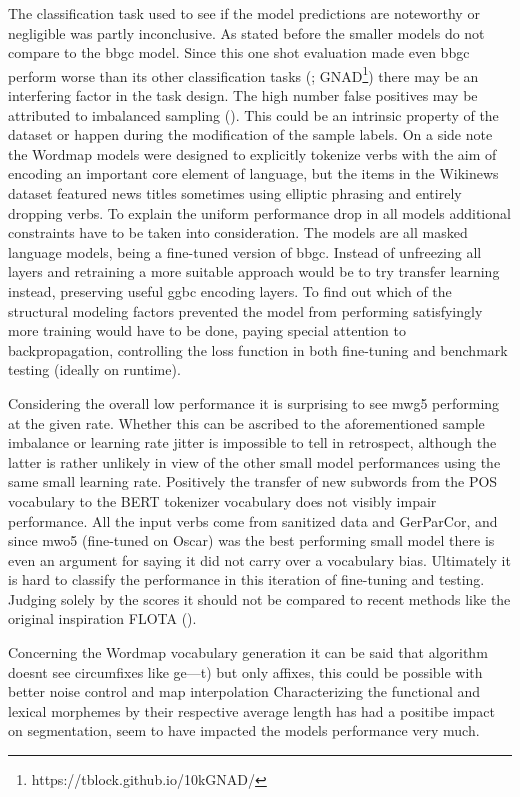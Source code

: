 The classification task used to see if the model predictions are noteworthy or negligible was partly inconclusive.
As stated before the smaller models do not compare to the bbgc model.
Since this one shot evaluation made even bbgc perform worse than its other classification tasks (\textcite{germeval}; GNAD\footnote{https://tblock.github.io/10kGNAD/}) there may be an interfering factor in the task design.
The high number false positives may be attributed to imbalanced sampling (\cite[5--6]{brownlee2020imbalanced}).
This could be an intrinsic property of the dataset or happen during the modification of the sample labels.
On a side note the Wordmap models were designed to explicitly tokenize verbs with the aim of encoding an important core element of language, but the items in the Wikinews dataset featured news titles sometimes using elliptic phrasing and entirely dropping verbs.
To explain the uniform performance drop in all models additional constraints have to be taken into consideration.
The models are all masked language models, being a fine-tuned version of bbgc.
Instead of unfreezing all layers and retraining a more suitable approach would be to try transfer learning instead, preserving useful ggbc encoding layers.
To find out which of the structural modeling factors prevented the model from performing satisfyingly more training would have to be done, paying special attention to backpropagation, controlling the loss function in both fine-tuning and benchmark testing (ideally on runtime).

Considering the overall low performance it is surprising to see mwg5 performing at the given rate.
Whether this can be ascribed to the aforementioned sample imbalance or learning rate jitter is impossible to tell in retrospect, although the latter is rather unlikely in view of the other small model performances using the same small learning rate.
Positively the transfer of new subwords from the POS vocabulary to the BERT tokenizer vocabulary does not visibly impair performance.
All the input verbs come from sanitized data and GerParCor, and since mwo5 (fine-tuned on Oscar) was the best performing small model there is even an argument for saying it did not carry over a vocabulary bias.
Ultimately it is hard to classify the performance in this iteration of fine-tuning and testing.
Judging solely by the scores it should not be compared to recent methods like the original inspiration FLOTA (\citeauthor{FLOTA}).

Concerning the Wordmap vocabulary generation it can be said that
algorithm doesnt see circumfixes like ge---t) but only affixes, this could be possible with better noise control and map interpolation
Characterizing the functional and lexical morphemes by their respective average length has had a positibe impact on segmentation, seem to have impacted the models performance very much.





